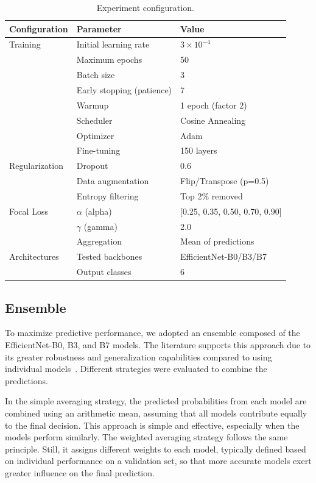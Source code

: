\begin{table}[htbp]
	\centering
	\begin{tabular}{@{}lll@{}}
		\toprule
		\textbf{Configuration} & \textbf{Parameter} & \textbf{Value} \\
		\midrule
		Training & Initial learning rate & $3 \times 10^{-4}$ \\
		& Maximum epochs & 50 \\
		& Batch size & 3 \\
		& Early stopping (patience) & 7 \\
		& Warmup & 1 epoch (factor 2) \\
		& Scheduler & Cosine Annealing \\
		& Optimizer & Adam \\
		& Fine-tuning & 150 layers \\
		\midrule
		Regularization & Dropout & 0.6 \\
		& Data augmentation & Flip/Transpose (p=0.5) \\
		& Entropy filtering & Top 2\% removed \\
		\midrule
		Focal Loss & $\alpha$ (alpha) & [0.25, 0.35, 0.50, 0.70, 0.90] \\
		& $\gamma$ (gamma) & 2.0 \\
		\midrule
		& Aggregation & Mean of predictions \\
		
		Architectures & Tested backbones & EfficientNet-B0/B3/B7 \\
		& Output classes & 6 \\
		\bottomrule
	\end{tabular}
	\caption{Experiment configuration.}
	\label{tab:baseline_config}
\end{table}


\subsection{Ensemble}
To maximize predictive performance, we adopted an ensemble composed of the EfficientNet-B0, B3, and B7 models. The literature supports this approach due to its greater robustness and generalization capabilities compared to using individual models~\cite{mian2024ensemble}. Different strategies were evaluated to combine the predictions.

In the simple averaging strategy, the predicted probabilities from each model are combined using an arithmetic mean, assuming that all models contribute equally to the final decision. This approach is simple and effective, especially when the models perform similarly. The weighted averaging strategy follows the same principle. Still, it assigns different weights to each model, typically defined based on individual performance on a validation set, so that more accurate models exert greater influence on the final prediction.

